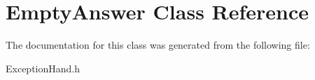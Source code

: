 \hypertarget{class_empty_answer}{}\section{Empty\+Answer Class Reference}
\label{class_empty_answer}


The documentation for this class was generated from the following file\+:\begin{DoxyCompactItemize}
\item 
Exception\+Hand.\+h\end{DoxyCompactItemize}
